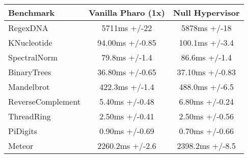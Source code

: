  \begin{table}[ht]

 	\centering
 	\begin{tabular}{|l|c|c|}%
			\hline
			\textbf{Benchmark}
 			& \textbf{Vanilla Pharo \VM (1x)}
			& \textbf{Null Hypervisor}\\
			
		\hline
		RegexDNA & 5711ms +/-22 & 5878ms +/-18 \\\hline%
		KNucleotide & 94.00ms +/-0.85 & 100.1ms +/-3.4\\\hline%
		SpectralNorm & 79.8ms +/-1.4 & 86.6ms +/-1.4\\\hline%
		BinaryTrees & 36.80ms +/-0.65 & 37.10ms +/-0.83 \\\hline%
		Mandelbrot & 422.3ms +/-1.4 & 488.0ms +/-6.5 \\\hline%
		ReverseComplement & 5.40ms +/-0.48 & 6.80ms +/-0.24 \\\hline%
		ThreadRing & 2.50ms +/-0.41 & 2.50ms +/-0.56\\\hline%
		PiDigits & 0.90ms +/-0.69 & 0.70ms +/-0.66 \\\hline%
		Meteor & 2260.2ms +/-2.6 & 2398.2ms +/-8.5 \\\hline%

\end{tabular}
\end{table}
